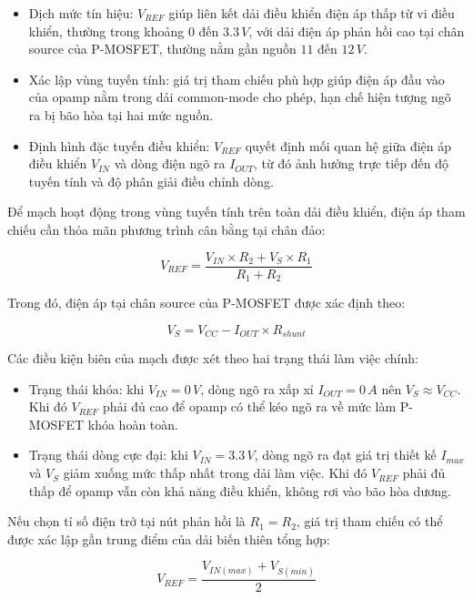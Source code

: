 \begin{itemize}
    \item Dịch mức tín hiệu: $V_{REF}$ giúp liên kết dải điều khiển điện áp thấp từ vi điều khiển, thường trong khoảng $0$ đến $3.3\,V$, với dải điện áp phản hồi cao tại chân source của P-MOSFET, thường nằm gần nguồn $11$ đến $12\,V$.
    \item Xác lập vùng tuyến tính: giá trị tham chiếu phù hợp giúp điện áp đầu vào của opamp nằm trong dải common-mode cho phép, hạn chế hiện tượng ngõ ra bị bão hòa tại hai mức nguồn.
    \item Định hình đặc tuyến điều khiển: $V_{REF}$ quyết định mối quan hệ giữa điện áp điều khiển $V_{IN}$ và dòng điện ngõ ra $I_{OUT}$, từ đó ảnh hưởng trực tiếp đến độ tuyến tính và độ phân giải điều chỉnh dòng.
\end{itemize}

Để mạch hoạt động trong vùng tuyến tính trên toàn dải điều khiển, điện áp tham chiếu cần thỏa mãn phương trình cân bằng tại chân đảo:

\begin{equation}
V_{REF} = \frac{V_{IN}\times R_2 + V_S\times R_1}{R_1 + R_2}
\end{equation}

Trong đó, điện áp tại chân source của P-MOSFET được xác định theo:

\begin{equation}
V_S = V_{CC} - I_{OUT}\times R_{shunt}
\end{equation}

Các điều kiện biên của mạch được xét theo hai trạng thái làm việc chính:

\begin{itemize}
    \item Trạng thái khóa: khi $V_{IN} = 0\,V$, dòng ngõ ra xấp xỉ $I_{OUT} = 0\,A$ nên $V_S \approx V_{CC}$. Khi đó $V_{REF}$ phải đủ cao để opamp có thể kéo ngõ ra về mức làm P-MOSFET khóa hoàn toàn.
    \item Trạng thái dòng cực đại: khi $V_{IN} = 3.3\,V$, dòng ngõ ra đạt giá trị thiết kế $I_{max}$ và $V_S$ giảm xuống mức thấp nhất trong dải làm việc. Khi đó $V_{REF}$ phải đủ thấp để opamp vẫn còn khả năng điều khiển, không rơi vào bão hòa dương.
\end{itemize}

Nếu chọn tỉ số điện trở tại nút phản hồi là $R_1 = R_2$, giá trị tham chiếu có thể được xác lập gần trung điểm của dải biến thiên tổng hợp:

\begin{equation}
V_{REF} = \frac{V_{IN(max)} + V_{S(min)}}{2}
\end{equation}

